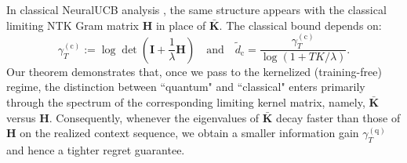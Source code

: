 \documentclass[pdflatex,sn-mathphys-num]{sn-jnl}%
\theoremstyle{thmstyleone}%
\theoremstyle{thmstyletwo}%
\theoremstyle{thmstylethree}%
\newcommand{\Kbf}{\mathbf{K}}
\newcommand{\Ibf}{\mathbf{I}}
\begin{document}
In  classical NeuralUCB analysis \cite{neuralucb}, the same structure appears with the classical limiting NTK Gram matrix $\mathbf{H}$ \cite{ntk} in place of $\bar{\Kbf}$. The classical bound depends on: $$\gamma_T^{(\text{c})} := \log \det \left( \Ibf + \frac{1}{\lambda} \mathbf{H} \right) \quad\mbox{and}\quad \widetilde{d}_{\text{c}} = \frac{\gamma_T^{(\text{c})}}{\log(1 + TK/\lambda)}.$$
Our theorem demonstrates that, once we pass to the kernelized (training-free) regime, the distinction between ``quantum" and ``classical" enters primarily through the spectrum of the corresponding limiting kernel matrix, namely, $\bar{\Kbf}$ versus $\mathbf{H}$. Consequently, whenever the eigenvalues of $\bar{\Kbf}$ decay faster than those of $\mathbf{H}$ on the realized context sequence, we obtain a smaller information gain $\gamma_T^{(\mathrm{q})}$ and hence a tighter regret guarantee.
\end{document}
